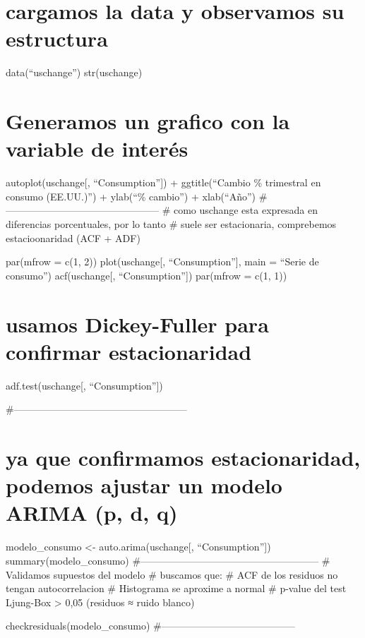 \documentclass[
]{article}
\begin{document}
\section{cargamos la data y observamos su
estructura}\label{cargamos-la-data-y-observamos-su-estructura}

data(``uschange'') str(uschange)

\section{Generamos un grafico con la variable de
interés}\label{generamos-un-grafico-con-la-variable-de-interuxe9s}

autoplot(uschange{[}, ``Consumption''{]}) + ggtitle(``Cambio \%
trimestral en consumo (EE.UU.)'') + ylab(``\% cambio'') + xlab(``Año'')
\# ----------------------------------------------- \# como uschange esta
expresada en diferencias porcentuales, por lo tanto \# suele ser
estacionaria, comprebemos estacioonaridad (ACF + ADF)

par(mfrow = c(1, 2)) plot(uschange{[}, ``Consumption''{]}, main =
``Serie de consumo'') acf(uschange{[}, ``Consumption''{]}) par(mfrow =
c(1, 1))

\section{usamos Dickey-Fuller para confirmar
estacionaridad}\label{usamos-dickey-fuller-para-confirmar-estacionaridad}

adf.test(uschange{[}, ``Consumption''{]})

\#-----------------------------------------------------

\section{ya que confirmamos estacionaridad, podemos ajustar un modelo
ARIMA (p, d,
q)}\label{ya-que-confirmamos-estacionaridad-podemos-ajustar-un-modelo-arima-p-d-q}

modelo\_consumo \textless- auto.arima(uschange{[}, ``Consumption''{]})
summary(modelo\_consumo)
\#------------------------------------------------------ \# Validamos
supuestos del modelo \# buscamos que: \# ACF de los residuos no tengan
autocorrelacion \# Histograma se aproxime a normal \# p-value del test
Ljung-Box \textgreater{} 0,05 (residuos ≈ ruido blanco)

checkresiduals(modelo\_consumo)
\#-----------------------------------------
\end{document}
